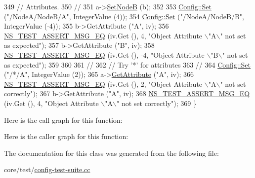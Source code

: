 \begin{DoxyCode}
349   \textcolor{comment}{// Attributes.}
350   \textcolor{comment}{//}
351   a->\hyperlink{classConfigTestObject_a4bbf3c248c741e2f0840c3db3a88ad5c}{SetNodeB} (b);
352 
353   \hyperlink{group__config_gadce03667ec621d64ce4aace85d9bcfd0}{Config::Set} (\textcolor{stringliteral}{"/NodeA/NodeB/A"}, IntegerValue (4));
354   \hyperlink{group__config_gadce03667ec621d64ce4aace85d9bcfd0}{Config::Set} (\textcolor{stringliteral}{"/NodeA/NodeB/B"}, IntegerValue (-4));
355   b->GetAttribute (\textcolor{stringliteral}{"A"}, iv);
356   \hyperlink{group__testing_ga2a9d78cffb3db8e867c35fff0b698cf5}{NS\_TEST\_ASSERT\_MSG\_EQ} (iv.Get (), 4, \textcolor{stringliteral}{"Object Attribute \(\backslash\)"A\(\backslash\)" not set as expected"});
357   b->GetAttribute (\textcolor{stringliteral}{"B"}, iv);
358   \hyperlink{group__testing_ga2a9d78cffb3db8e867c35fff0b698cf5}{NS\_TEST\_ASSERT\_MSG\_EQ} (iv.Get (), -4, \textcolor{stringliteral}{"Object Attribute \(\backslash\)"B\(\backslash\)" not set as expected"});
359 
360 
361   \textcolor{comment}{//}
362   \textcolor{comment}{// Try '*' for attributes}
363   \textcolor{comment}{//}
364   \hyperlink{group__config_gadce03667ec621d64ce4aace85d9bcfd0}{Config::Set} (\textcolor{stringliteral}{"/*/A"}, IntegerValue (2));
365   a->\hyperlink{classns3_1_1ObjectBase_a895d1de2f96063d0e0fd78463e7a7e30}{GetAttribute} (\textcolor{stringliteral}{"A"}, iv);
366   \hyperlink{group__testing_ga2a9d78cffb3db8e867c35fff0b698cf5}{NS\_TEST\_ASSERT\_MSG\_EQ} (iv.Get (), 2, \textcolor{stringliteral}{"Object Attribute \(\backslash\)"A\(\backslash\)" not set correctly"});
367   b->GetAttribute (\textcolor{stringliteral}{"A"}, iv);
368   \hyperlink{group__testing_ga2a9d78cffb3db8e867c35fff0b698cf5}{NS\_TEST\_ASSERT\_MSG\_EQ} (iv.Get (), 4, \textcolor{stringliteral}{"Object Attribute \(\backslash\)"A\(\backslash\)" not set correctly"});
369 \}
\end{DoxyCode}


Here is the call graph for this function\+:




Here is the caller graph for this function\+:




The documentation for this class was generated from the following file\+:\begin{DoxyCompactItemize}
\item 
core/test/\hyperlink{config-test-suite_8cc}{config-\/test-\/suite.\+cc}\end{DoxyCompactItemize}
